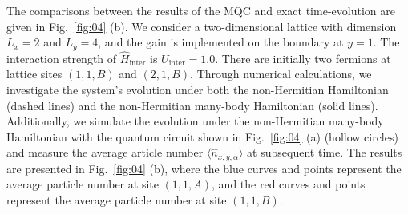 \documentclass[longbibliography, aps, prx, amsmath, amssymb, amsfonts, twocolumn,superscriptaddress, footinbib]{revtex4-1}
\begin{document}
	The comparisons between the results of the MQC and exact time-evolution are given in Fig.~\ref{fig:04} (b). 
	We consider a two-dimensional lattice with dimension $L_x=2$ and $L_y=4$, and the gain is implemented on the boundary at $y=1$. The interaction strength of $\hat{H}_{\text{inter}}$ is $U_{\text{inter}}=1.0$.
	There are initially two fermions at lattice sites $(1,1,B)$ and $(2,1,B)$. Through numerical calculations, we investigate the system's evolution under both the non-Hermitian Hamiltonian (dashed lines) and the non-Hermitian many-body Hamiltonian (solid lines). Additionally, we simulate the evolution under the non-Hermitian many-body Hamiltonian with the quantum circuit shown in Fig.~\ref{fig:04} (a) (hollow circles) and measure the average article number $\langle \hat{n}_{x,y,\alpha}\rangle$ at subsequent time. The results are presented in Fig.~\ref{fig:04} (b), where the blue curves and points represent the average particle number at site $(1,1,A)$, and the red curves and points represent the average particle number at site $(1,1,B)$.
\end{document}
